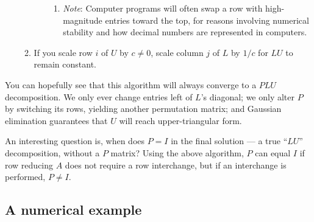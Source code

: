 \documentclass[draft,12pt]{report}
\begin{document}
\begin{enumerate}
\begin{enumerate}
\begin{enumerate}
            \begin{enumerate}
                \item \emph{Note}: Computer programs will often swap a row with high-magnitude entries toward the top, for reasons involving numerical stability and how decimal numbers are represented in computers.
            \end{enumerate}
        \end{enumerate}
        \item If you scale row $i$ of $U$ by $c \neq 0$, scale column $j$ of $L$ by $1/c$ for $LU$ to remain constant.
    \end{enumerate}
\end{enumerate}
You can hopefully see that this algorithm will always converge to a $PLU$ decomposition. We only ever change entries left of $L$'s diagonal; we only alter $P$ by switching its rows, yielding another permutation matrix; and Gaussian elimination guarantees that $U$ will reach upper-triangular form.

An interesting question is, when does $P = I$ in the final solution --- a true ``$LU$'' decomposition, without a $P$ matrix? Using the above algorithm, $P$ can equal $I$ if row reducing $A$ does not require a row interchange, but if an interchange is performed, $P \neq I$.

\subsection{A numerical example}
\end{document}
